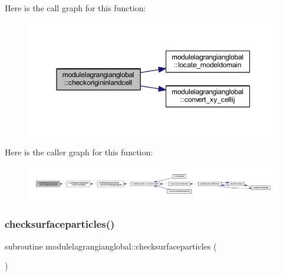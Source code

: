 Here is the call graph for this function\+:\nopagebreak
\begin{figure}[H]
\begin{center}
\leavevmode
\includegraphics[width=350pt]{namespacemodulelagrangianglobal_a356193ac68adebe4d96ff99a2bb2ba2d_cgraph}
\end{center}
\end{figure}
Here is the caller graph for this function\+:\nopagebreak
\begin{figure}[H]
\begin{center}
\leavevmode
\includegraphics[width=350pt]{namespacemodulelagrangianglobal_a356193ac68adebe4d96ff99a2bb2ba2d_icgraph}
\end{center}
\end{figure}
\mbox{\label{namespacemodulelagrangianglobal_af1cf941e45155a5b9a97ed3fe09f5c58}} 
\subsubsection{\texorpdfstring{checksurfaceparticles()}{checksurfaceparticles()}}
{\footnotesize\ttfamily subroutine modulelagrangianglobal\+::checksurfaceparticles (\begin{DoxyParamCaption}{ }\end{DoxyParamCaption})\hspace{0.3cm}{\ttfamily [private]}}

